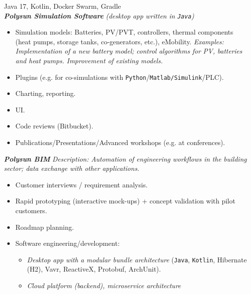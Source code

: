 \documentclass[11pt,a4paper,ngerman,sans]{moderncv}
\begin{document}
{
  Java 17, Kotlin, Docker Swarm, Gradle\newline
  \\
	\textbf{\emph{Polysun Simulation Software}} \emph{(desktop app written in \texttt{Java})\newline}
  \begin{itemize}
    \item Simulation models: Batteries, PV/PVT, controllers, thermal components\newline
      (heat pumps, storage tanks, co-generators, etc.), eMobility.\newline
      \emph{
       Examples: Implementation of a new battery model;\newline
       control algorithms for PV, batteries and heat pumps.\newline
       Improvement of existing models.
      }
    \item Plugins (e.g. for co-simulations with \texttt{Python}/\texttt{Matlab/Simulink}/PLC).
    \item Charting, reporting.
    \item UI. 
    \item Code reviews (Bitbucket).
    \item Publications/Presentations/Advanced workshops (e.g. at conferences).
      \\
  \end{itemize}
	\textbf{\emph{Polysun BIM}\newline} 
	\emph{Description: Automation of engineering workflows in the building sector;\newline
	data exchange with other applications.}\newline
  \begin{itemize}
    \item Customer interviews / requirement analysis.
    \item Rapid prototyping (interactive mock-ups) + concept validation with pilot customers.
    \item Roadmap planning.
    \item Software engineering/development:
      \begin{itemize}
        \item \emph{Desktop app with a modular bundle architecture}\newline
          (\texttt{Java}, \texttt{Kotlin}, Hibernate (H2), Vavr, ReactiveX, Protobuf, ArchUnit).
        \item \emph{Cloud platform (backend), microservice architecture}\newline

\end{itemize}
\end{itemize}}
\end{document}
